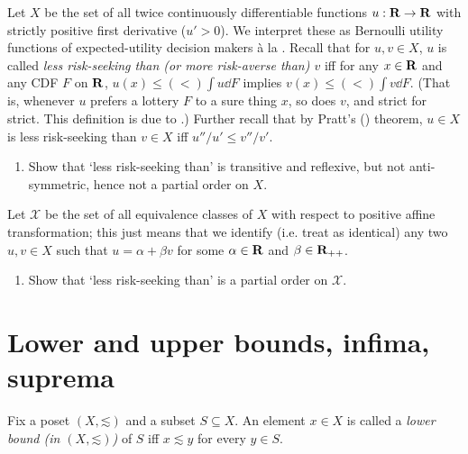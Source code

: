 \begin{exercise}
	\label{exercise:arrow-pratt}
	Let $X$ be the set of all twice continuously differentiable functions $u : \mathbf{R} \to \mathbf{R}$ with strictly positive first derivative ($u'>0$). We interpret these as Bernoulli utility functions of expected-utility decision makers à la \textcite{VonneumannMorgenstern1947}. Recall that for $u,v \in X$, $u$ is called \emph{less risk-seeking than (or more risk-averse than) $v$} iff for any $x \in \mathbf{R}$ and any CDF $F$ on $\mathbf{R}$, $u(x) \leq \mathrel{(<)} \int u \dd F$ implies $v(x) \leq \mathrel{(<)} \int v \dd F$. (That is, whenever $u$ prefers a lottery $F$ to a sure thing $x$, so does $v$, and strict for strict. This definition is due to \textcite{Yaari1969}.) Further recall that by Pratt's (\citeyear{Pratt1964}) theorem, $u \in X$ is less risk-seeking than $v \in X$ iff $u'' / u' \leq v''/v'$.
	
	\begin{enumerate}[label=(\alph*)]
	
		\item Show that `less risk-seeking than' is transitive and reflexive, but not anti-symmetric, hence not a partial order on $X$.

	\end{enumerate}
	Let $\mathcal{X}$ be the set of all equivalence classes of $X$ with respect to positive affine transformation; this just means that we identify (i.e. treat as identical) any two $u,v \in X$ such that $u = \alpha + \beta v$ for some $\alpha \in \mathbf{R}$ and $\beta \in \mathbf{R}_{++}$.

	\begin{enumerate}[label=(\alph*),resume]

		\item \label{item:arrow-pratt:b} Show that `less risk-seeking than' is a partial order on $\mathcal{X}$.
	
	\end{enumerate}
\end{exercise}



\section{Lower and upper bounds, infima, suprema}
\label{tar:bounds}

\begin{definition}
	\label{definition:lb}
	Fix a poset $(X,\mathord{\lesssim})$ and a subset $S \subseteq X$. An element $x \in X$ is called a \emph{lower bound (in $(X,\mathord{\lesssim})$)} of $S$ iff $x \lesssim y$ for every $y \in S$.
\end{definition}

